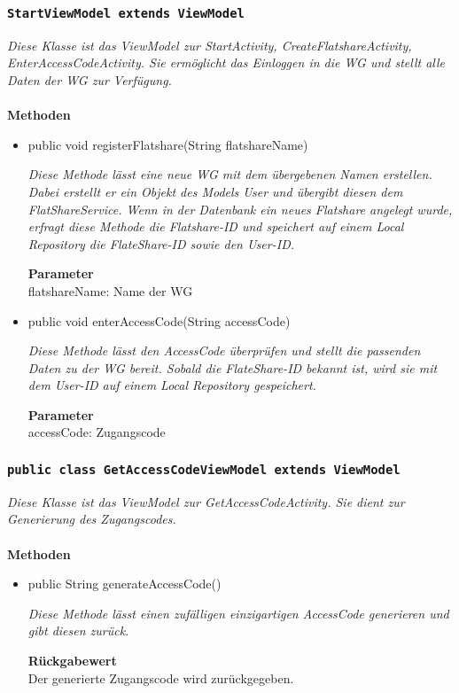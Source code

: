              	\subsubsection{\texttt{StartViewModel extends ViewModel}}
        \textit{Diese Klasse ist das ViewModel zur StartActivity, CreateFlatshareActivity, EnterAccessCodeActivity. Sie ermöglicht das Einloggen in die WG und stellt alle Daten der WG zur Verfügung.}\\
        \\
		\textbf{Methoden} \\
 			\begin{itemize}
        		\item{public void registerFlatshare(String flatshareName)}
        	
        		\textit{Diese Methode lässt eine neue WG mit dem übergebenen Namen erstellen. Dabei erstellt er ein Objekt des Models User und übergibt diesen dem FlatShareService. Wenn in der Datenbank ein neues Flatshare angelegt wurde, erfragt diese Methode die Flatshare-ID und speichert auf einem Local Repository die FlateShare-ID sowie den User-ID.}
        	
        		\textbf{Parameter} \\
				flatshareName: Name der WG


        		\item{public void enterAccessCode(String accessCode)}
        	
        		\textit{Diese Methode lässt den AccessCode überprüfen und stellt die passenden Daten zu der WG bereit. Sobald die FlateShare-ID bekannt ist, wird sie mit dem User-ID auf einem Local Repository gespeichert.}
        	
        		\textbf{Parameter} \\
				accessCode: Zugangscode
   
       		 \end{itemize}
             
             		\subsubsection{\texttt{public class GetAccessCodeViewModel extends ViewModel}}
        \textit{Diese Klasse ist das ViewModel zur GetAccessCodeActivity. Sie dient zur Generierung des Zugangscodes.}\\
        \\
		\textbf{Methoden} \\
 			\begin{itemize}
        		\item{public String generateAccessCode()}
        	
        		\textit{Diese Methode lässt einen zufälligen einzigartigen AccessCode generieren und gibt diesen zurück.}
        	
        		\textbf{Rückgabewert} \\
				Der generierte Zugangscode wird zurückgegeben.
   
       		 \end{itemize}
             
